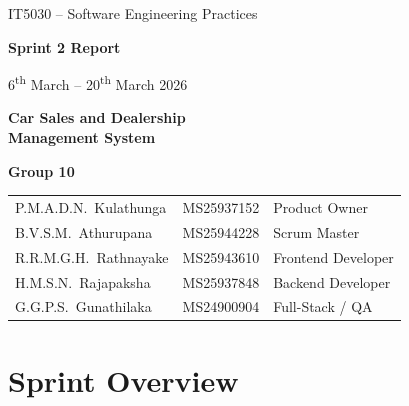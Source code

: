 \documentclass[12pt,a4paper]{article}
\begin{document}
\begin{titlepage}
\thispagestyle{empty}
\begin{center}
\vspace*{2cm}

{\large\color{black!60} IT5030 -- Software Engineering Practices}

\vspace{1cm}

{\Huge\bfseries\color{DarkText} Sprint 2 Report}

\vspace{0.3cm}

{\large\color{black!50} 6\textsuperscript{th} March -- 20\textsuperscript{th} March 2026}

\vspace{0.8cm}

{\LARGE\bfseries\color{black!70} Car Sales and Dealership\\Management System}

\vspace{2cm}

{\Large\bfseries\color{DarkText} Group 10}

\vspace{0.8cm}

\begin{tabular}{l l l}
P.M.A.D.N.\ Kulathunga & MS25937152 & Product Owner \\
B.V.S.M.\ Athurupana   & MS25944228 & Scrum Master \\
R.R.M.G.H.\ Rathnayake & MS25943610 & Frontend Developer \\
H.M.S.N.\ Rajapaksha   & MS25937848 & Backend Developer \\
G.G.P.S.\ Gunathilaka  & MS24900904 & Full-Stack / QA \\
\end{tabular}

\end{center}
\end{titlepage}

\newpage
\tableofcontents
\newpage

\section{Sprint Overview}
\end{document}
